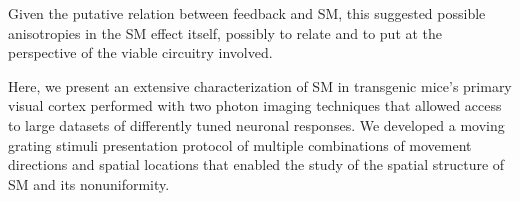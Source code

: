 Given the putative relation between feedback and SM, this suggested possible anisotropies in the SM effect itself, possibly to relate and to put at the perspective of the viable circuitry involved.

Here, we present an extensive characterization of SM in transgenic mice's primary visual cortex performed with two photon imaging techniques that allowed access to large datasets of differently tuned neuronal responses. We developed a moving grating stimuli presentation protocol of multiple combinations of movement directions and spatial locations that enabled the study of the spatial structure of SM and its nonuniformity.





